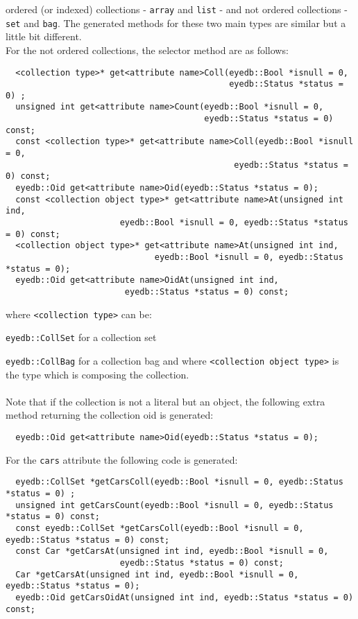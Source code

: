 ordered (or indexed) collections - \texttt{array} and \texttt{list} - and not
ordered collections - \texttt{set} and \texttt{bag}.
The generated methods for these two main types are similar but a
little bit different.
\\
For the not ordered collections, the selector method are as follows:
\verbsize
\begin{verbatim}
  <collection type>* get<attribute name>Coll(eyedb::Bool *isnull = 0,
                                             eyedb::Status *status = 0) ;
  unsigned int get<attribute name>Count(eyedb::Bool *isnull = 0,
                                        eyedb::Status *status = 0) const;
  const <collection type>* get<attribute name>Coll(eyedb::Bool *isnull = 0,
                                              eyedb::Status *status = 0) const;
  eyedb::Oid get<attribute name>Oid(eyedb::Status *status = 0);
  const <collection object type>* get<attribute name>At(unsigned int ind,
                       eyedb::Bool *isnull = 0, eyedb::Status *status = 0) const;
  <collection object type>* get<attribute name>At(unsigned int ind,
                              eyedb::Bool *isnull = 0, eyedb::Status *status = 0);
  eyedb::Oid get<attribute name>OidAt(unsigned int ind,
                        eyedb::Status *status = 0) const;
\end{verbatim}
\normalsize
where \texttt{<collection type>} can be:
\be
\item \texttt{eyedb::CollSet} for a collection set
\item \texttt{eyedb::CollBag} for a collection bag
\ee
and where \texttt{<collection object type>} is the type which is composing
the collection.
\\
\\
Note that if the collection is not a literal but an object, the following
extra method returning the collection oid is generated:
\verbsize
\begin{verbatim}
  eyedb::Oid get<attribute name>Oid(eyedb::Status *status = 0);
\end{verbatim}
\normalsize
For the \texttt{cars} attribute the following code is generated:
\verbsize
\begin{verbatim}
  eyedb::CollSet *getCarsColl(eyedb::Bool *isnull = 0, eyedb::Status *status = 0) ;
  unsigned int getCarsCount(eyedb::Bool *isnull = 0, eyedb::Status *status = 0) const;
  const eyedb::CollSet *getCarsColl(eyedb::Bool *isnull = 0, eyedb::Status *status = 0) const;
  const Car *getCarsAt(unsigned int ind, eyedb::Bool *isnull = 0,
                       eyedb::Status *status = 0) const;
  Car *getCarsAt(unsigned int ind, eyedb::Bool *isnull = 0, eyedb::Status *status = 0);
  eyedb::Oid getCarsOidAt(unsigned int ind, eyedb::Status *status = 0) const;
\end{verbatim}
